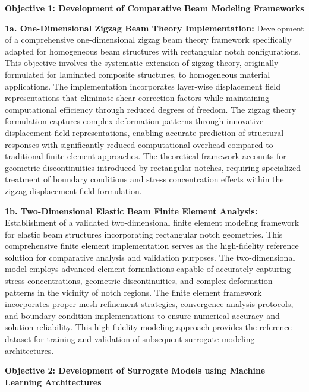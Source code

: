 \documentclass[12pt,a4paper]{report}
\begin{document}
\bigskip

\textbf{Objective 1: Development of Comparative Beam Modeling Frameworks}

\medskip

\textbf{1a. One-Dimensional Zigzag Beam Theory Implementation:} Development of a comprehensive one-dimensional zigzag beam theory framework specifically adapted for homogeneous beam structures with rectangular notch configurations. This objective involves the systematic extension of zigzag theory, originally formulated for laminated composite structures, to homogeneous material applications. The implementation incorporates layer-wise displacement field representations that eliminate shear correction factors while maintaining computational efficiency through reduced degrees of freedom. The zigzag theory formulation captures complex deformation patterns through innovative displacement field representations, enabling accurate prediction of structural responses with significantly reduced computational overhead compared to traditional finite element approaches. The theoretical framework accounts for geometric discontinuities introduced by rectangular notches, requiring specialized treatment of boundary conditions and stress concentration effects within the zigzag displacement field formulation.

\medskip

\textbf{1b. Two-Dimensional Elastic Beam Finite Element Analysis:} Establishment of a validated two-dimensional finite element modeling framework for elastic beam structures incorporating rectangular notch geometries. This comprehensive finite element implementation serves as the high-fidelity reference solution for comparative analysis and validation purposes. The two-dimensional model employs advanced element formulations capable of accurately capturing stress concentrations, geometric discontinuities, and complex deformation patterns in the vicinity of notch regions. The finite element framework incorporates proper mesh refinement strategies, convergence analysis protocols, and boundary condition implementations to ensure numerical accuracy and solution reliability. This high-fidelity modeling approach provides the reference dataset for training and validation of subsequent surrogate modeling architectures.

\bigskip

\textbf{Objective 2: Development of Surrogate Models using Machine Learning Architectures}

\medskip
\end{document}
